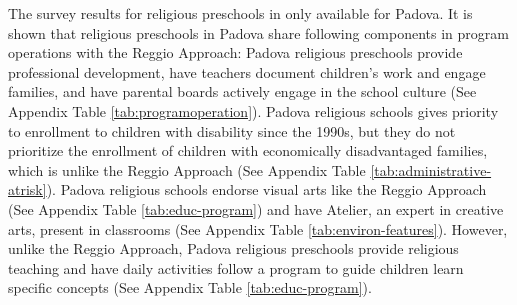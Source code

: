 The survey results for religious preschools in only available for Padova. It is shown that religious preschools in Padova share following components in program operations with the Reggio Approach: Padova religious preschools provide professional development, have teachers document children's work and engage families, and have parental boards actively engage in the school culture (See Appendix Table \ref{tab:programoperation}). Padova religious schools gives priority to enrollment to children with disability since the 1990s, but they do not prioritize the enrollment of children with economically disadvantaged families, which is unlike the Reggio Approach (See Appendix Table \ref{tab:administrative-atrisk}). Padova religious schools endorse visual arts like the Reggio Approach (See Appendix Table \ref{tab:educ-program}) and have Atelier, an expert in creative arts, present in classrooms (See Appendix Table \ref{tab:environ-features}). However, unlike the Reggio Approach, Padova religious preschools provide religious teaching and have daily activities follow a program to guide children learn specific concepts (See Appendix Table \ref{tab:educ-program}).

